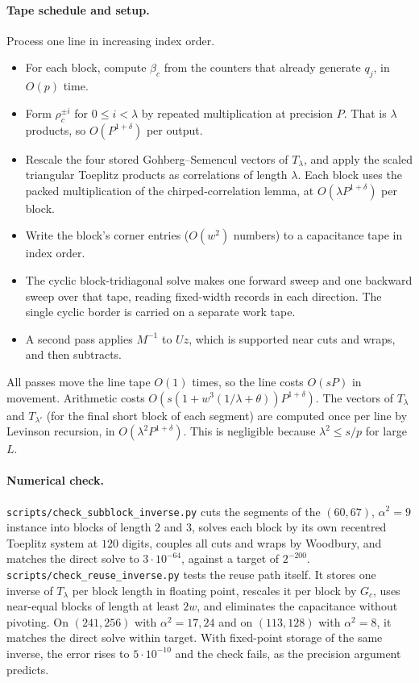 \documentclass[11pt]{article}
\theoremstyle{remark}\newtheorem*{remark}{Remark}
\begin{document}
\paragraph{Tape schedule and setup.} Process one line in increasing index order.
\begin{itemize}
\item For each block, compute $\beta_c$ from the counters that already generate $q_j$, in $O(p)$
time.
\item Form $\rho_c^{\pm i}$ for $0\le i<\lambda$ by repeated multiplication at precision $P$. That is
$\lambda$ products, so $O(P^{1+\delta})$ per output.
\item Rescale the four stored Gohberg--Semencul vectors of $T_\lambda$, and apply the scaled
triangular Toeplitz products as correlations of length $\lambda$. Each block uses the packed
multiplication of the chirped-correlation lemma, at $O(\lambda P^{1+\delta})$ per block.
\item Write the block's corner entries ($O(w^2)$ numbers) to a capacitance tape in index order.
\item The cyclic block-tridiagonal solve makes one forward sweep and one backward sweep over
that tape, reading fixed-width records in each direction. The single cyclic border is carried
on a separate work tape.
\item A second pass applies $M^{-1}$ to $Uz$, which is supported near cuts and wraps, and then
subtracts.
\end{itemize}
All passes move the line tape $O(1)$ times, so the line costs $O(sP)$ in movement. Arithmetic
costs $O(s(1+w^3(1/\lambda+\theta))P^{1+\delta})$. The vectors of $T_\lambda$ and $T_{\lambda'}$
(for the final short block of each segment) are computed once per line by Levinson recursion,
in $O(\lambda^2P^{1+\delta})$. This is negligible because $\lambda^2\le s/p$ for large $L$.

\paragraph{Numerical check.} \texttt{scripts/check\_subblock\_inverse.py} cuts the
segments of the $(60,67)$, $\alpha^2=9$ instance into blocks of length $2$ and $3$, solves each
block by its own recentred Toeplitz system at $120$ digits, couples all cuts and wraps by
Woodbury, and matches the direct solve to $3\cdot10^{-64}$, against a target of $2^{-200}$.
\texttt{scripts/check\_reuse\_inverse.py} tests the reuse path itself. It stores one inverse of
$T_\lambda$ per block length in floating point, rescales it per block by $G_c$, uses near-equal
blocks of length at least $2w$, and eliminates the capacitance without pivoting. On $(241,256)$
with $\alpha^2=17,24$ and on $(113,128)$ with $\alpha^2=8$, it matches the direct solve within
target. With fixed-point storage of the same inverse, the error rises to $5\cdot10^{-10}$ and the
check fails, as the precision argument predicts.
\end{document}
